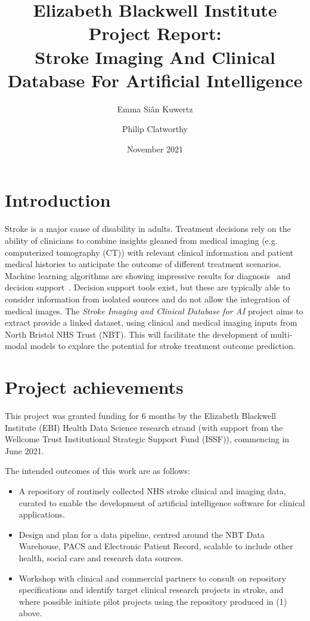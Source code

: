 \documentclass{article}
\title{
  Elizabeth Blackwell Institute Project Report:\\
  Stroke Imaging And Clinical Database For Artificial
  Intelligence
}
\author[1]{Emma Si\^{a}n Kuwertz}
\author[2,3]{Philip Clatworthy}
\affil[1]{Jean Golding Institute, University of Bristol}
\affil[2]{North Bristol NHS Trust}
\affil[3]{Bristol Medical School, University of Bristol}
\date{November 2021}
\begin{document}
\maketitle
\newpage
\tableofcontents
\newpage
\section{Introduction}

Stroke is a major cause of disability in adults. Treatment
decisions rely on the ability of clinicians to combine insights
gleaned from medical imaging (e.g. computerized tomography (CT)) with
relevant clinical information and patient medical histories to anticipate the outcome of different treatment
scenarios.
Machine learning algorithms are showing impressive results for diagnosis~\cite{ai_mam} and decision support~\cite{clinical_dec_support}. 
Decision support tools exist, but these are typically able
to consider information from isolated sources and do not allow the
integration of medical images. The \textit{Stroke Imaging and Clinical
Database for AI} project aims to extract provide a linked dataset,
using clinical and medical imaging inputs from North Bristol NHS Trust (NBT). 
This will facilitate the development of multi-modal models to explore the potential for stroke treatment outcome
prediction.\\



\section{Project achievements}

This project was granted funding for 6 months by the Elizabeth
Blackwell Institute (EBI) Health Data Science research strand (with
support from the Wellcome Trust Institutional Strategic Support Fund
(ISSF)), commencing in June 2021.

The intended outcomes of this work are as follows:
\begin{itemize}
\item 	A repository of routinely collected NHS stroke clinical and imaging data, curated to enable the development of artificial intelligence software for clinical applications. 
\item 	Design and plan for a data pipeline, centred around the NBT Data Warehouse, PACS and Electronic Patient Record, scalable to include other health, social care and research data sources. 
\item 	Workshop with clinical and commercial partners to consult on
  repository specifications and identify target clinical research
  projects in stroke, and where possible initiate pilot projects using
  the repository produced in (1) above.
\end{itemize}
\end{document}
